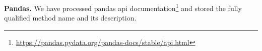 
\textbf{Pandas.} We have processed pandas api documentation\footnote{\url{https://pandas.pydata.org/pandas-docs/stable/api.html}} and stored the fully qualified method name and its description.